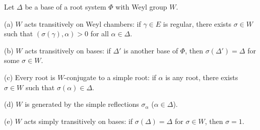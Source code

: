 Let $\Delta$ be a base of a root system $\Phi$ with Weyl group $W$.

(a) $W$ acts transitively on Weyl chambers: if $\gamma \in E$ is regular, there exists $\sigma \in W$ such that $(\sigma(\gamma), \alpha) > 0$ for all $\alpha \in \Delta$.

(b) $W$ acts transitively on bases: if $\Delta'$ is another base of $\Phi$, then $\sigma(\Delta') = \Delta$ for some $\sigma \in W$.

(c) Every root is $W$-conjugate to a simple root: if $\alpha$ is any root, there exists $\sigma \in W$ such that $\sigma(\alpha) \in \Delta$.

(d) $W$ is generated by the simple reflections $\sigma_\alpha$ ($\alpha \in \Delta$).

(e) $W$ acts simply transitively on bases: if $\sigma(\Delta) = \Delta$ for $\sigma \in W$, then $\sigma = 1$.